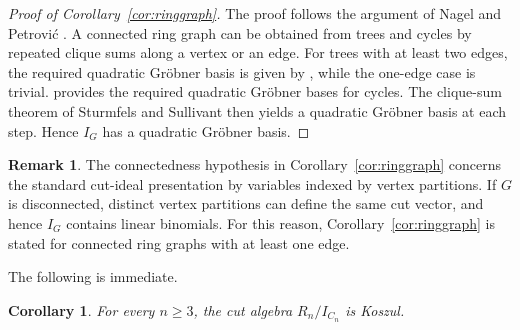 \documentclass[11pt]{amsart}
\newtheorem{corollary}[theorem]{Corollary}
\theoremstyle{definition}
\newtheorem{remark}[theorem]{Remark}
\numberwithin{equation}{section}
\begin{document}
\begin{proof}[Proof of Corollary~\ref{cor:ringgraph}]
The proof follows the argument of Nagel and Petrovi\'c
\cite[Theorem~6.2]{NagelPetrovic2009}.
A connected ring graph can be obtained from trees and cycles by repeated
clique sums along a vertex or an edge. For trees with at least two edges,
the required quadratic Gr\"obner basis is given by
\cite[Corollary~4.3]{NagelPetrovic2009}, while the one-edge case is trivial.
 provides the required quadratic Gr\"obner bases for cycles.
The clique-sum theorem of Sturmfels and Sullivant
\cite[Theorem~2.1]{SturmfelsSullivant2008}
then yields a quadratic Gr\"obner basis at each step.
Hence $I_G$ has a quadratic Gr\"obner basis.
\end{proof}



\begin{remark}\label{rem:disconnected}
The connectedness hypothesis in Corollary~\ref{cor:ringgraph} concerns the standard cut-ideal presentation by variables indexed by vertex partitions. If $G$ is disconnected, distinct vertex partitions can define the same cut vector, and hence $I_G$ contains linear binomials. For this reason, Corollary~\ref{cor:ringgraph} is stated for connected ring graphs with at least one edge.
\end{remark}

The following is immediate.

\begin{corollary}\label{cor:koszul}
For every $n\ge3$, the cut algebra $R_n/I_{C_n}$ is Koszul.
\end{corollary}
\end{document}
